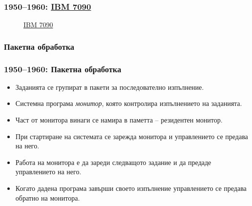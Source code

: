 \documentclass[ignorenonframetext, hyperref=unicode]{beamer}
\begin{document}

\begin{frame}
\frametitle{1950--1960: \href{http://en.wikipedia.org/wiki/IBM_7090}{IBM 7090}}
\begin{figure}[h]
\center
{}
\caption{\href{http://www-03.ibm.com/ibm/history/exhibits/mainframe/mainframe_PP7090.html}{IBM 7090}}
\end{figure}
\end{frame}


\subsubsection{Пакетна обработка}

\begin{frame}
\frametitle{1950--1960: Пакетна обработка}
\begin{itemize}
  \item Заданията се групират в пакети за последователно
  изпълнение.
  \item Системна програма {\em монитор}, която контролира изпълнението на
  заданията. 
  \item Част от монитора винаги се намира в паметта -- резидентен монитор.
  \item При стартиране на системата се зарежда монитора и управлението се
  предава на него.
  \item Работа на монитора е да зареди следващото задание и да предаде
  управлението на него.
  \item Когато дадена програма завърши своето изпълнение управлението се предава
  обратно на монитора.
\end{itemize}
\end{frame}
\end{document}

